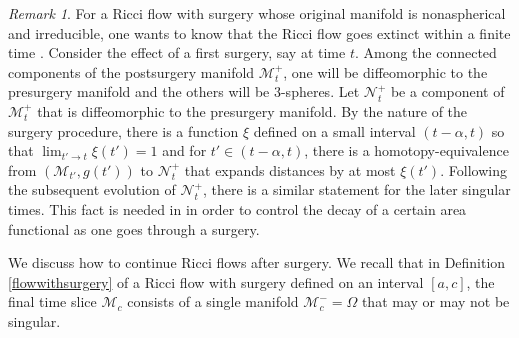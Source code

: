 \documentclass[12pt]{amsart}
\newcommand{\M}{{\mathcal M}}
\numberwithin{equation}{section}
\theoremstyle{plain}
\theoremstyle{definition}
\theoremstyle{remark}
\newtheorem{remark}[equation]{Remark}
\begin{document}
\begin{remark}
For a Ricci flow with surgery whose original manifold is nonaspherical and
irreducible,
one wants to know that the Ricci flow goes extinct within a finite time
\cite{Colding-Minicozzi,Colding-Minicozzi2,Perelman3}. 
Consider the effect of a first surgery, say at time $t$. Among the connected
components of the postsurgery
manifold $\M_{t}^+$, one will
be diffeomorphic to the presurgery manifold
 and the others will be $3$-spheres.
Let ${\mathcal N}_{t}^+$ be a component  of $\M_{t}^+$ that is diffeomorphic to 
the presurgery manifold.
By the nature of the surgery procedure, there is a 
 function
$\xi$ defined on a small interval $(t-\alpha, t)$ so that
$\lim_{t' \rightarrow t} \xi(t') = 1$ and for $t' \in (t - \alpha, t)$,
there is a homotopy-equivalence from $(\M_{t'}, g(t'))$ to ${\mathcal N}_{t}^+$ that
expands distances by at most $\xi(t')$. Following the 
subsequent evolution of
${\mathcal N}_{t}^+$, 
there is a similar statement for
the later singular times. This fact is needed in
\cite{Colding-Minicozzi,Colding-Minicozzi2,Perelman3} 
in order to control the decay of
a certain area functional as one goes through a surgery.
\end{remark}

We discuss how to continue Ricci flows after surgery.
We recall that in Definition \ref{flowwithsurgery}  of a Ricci flow with surgery defined
on an interval $[a,c]$, the final time slice $\M_c$ consists of a single
manifold $\M_c^- = \Omega$ that may or may not be singular.
\end{document}
